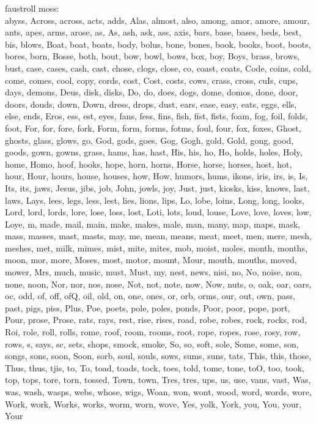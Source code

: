 faustroll moss:\\
abyss, Across, across, acts, adds, Alas, almost, also, among, amor, amore, amour, ants, apes, arms, arose, as, As, ash, ask, ass, axis, bars, base, bases, beds, best, bis, blows, Boat, boat, boats, body, bolus, bone, bones, book, books, boot, boots, bores, born, Bosse, both, bout, bow, bowl, bows, box, boy, Boys, brass, brows, bust, case, cases, cash, cast, chose, clogs, close, co, coast, coats, Code, coins, cold, come, comes, cool, copy, cords, cost, Cost, costs, cows, crass, cross, cuIs, cups, days, demons, Deus, disk, disks, Do, do, does, dogs, dome, domos, done, door, doors, douds, down, Down, dress, drops, dust, ears, ease, easy, eats, eggs, ells, else, ends, Eros, ess, est, eyes, fans, fess, fins, fish, fist, fists, foam, fog, foil, folds, foot, For, for, fore, fork, Form, form, forms, fotms, foul, four, fox, foxes, Ghost, ghosts, glass, glows, go, God, gods, goes, Gog, Gogh, gold, Gold, gong, good, goods, gown, gowns, grass, hams, has, hast, His, his, ho, Ho, holds, holes, Holy, home, Homo, hoof, hooks, hope, horn, horns, Horse, horse, horses, host, hot, hour, Hour, hours, house, houses, how, How, humors, hums, ikons, iris, irs, is, Is, Its, its, jaws, Jesus, jibs, job, John, jowls, joy, Just, just, kiosks, kiss, knows, last, laws, Lays, lees, legs, less, lest, lies, lions, lips, Lo, lobe, loins, Long, long, looks, Lord, lord, lords, lore, lose, loss, lost, Loti, lots, loud, louse, Love, love, loves, low, Loye, m, made, mail, main, make, makes, male, man, many, map, maps, mask, mass, masses, mast, masts, may, me, mean, means, meat, meet, men, mere, mesh, meshes, met, milk, mimes, mist, mite, mites, mob, moist, moles, month, months, moon, mor, more, Moses, most, motor, mount, Mour, mouth, mouths, moved, mower, Mrs, much, music, must, Must, my, nest, news, nisi, no, No, noise, non, none, noon, Nor, nor, nos, nose, Not, not, note, now, Now, nuts, o, oak, oar, oars, oc, odd, of, off, ofQ, oil, old, on, one, ones, or, orb, orms, our, out, own, pass, past, pigs, piss, Plus, Poe, poets, pole, poles, ponds, Poor, poor, pope, port, Pour, prose, Prose, rats, rays, rest, rise, rises, road, robe, robes, rock, rocks, rod, Roi, role, roll, rolls, rome, roof, room, rooms, root, rope, ropes, rose, rosy, row, rows, s, says, sc, sets, shops, smock, smoke, So, so, soft, sole, Some, some, son, songs, sons, soon, Soon, sorb, soul, souls, sows, sums, suns, tats, This, this, those, Thus, thus, tjis, to, To, toad, toads, tock, toes, told, tome, tone, toO, too, took, top, tops, tore, torn, tossed, Town, town, Tres, tres, ups, us, use, vans, vast, Was, was, wash, wasps, webs, whose, wigs, Woan, won, wont, wood, word, words, wore, Work, work, Works, works, worm, worn, wove, Yes, yolk, York, you, You, your, Your


